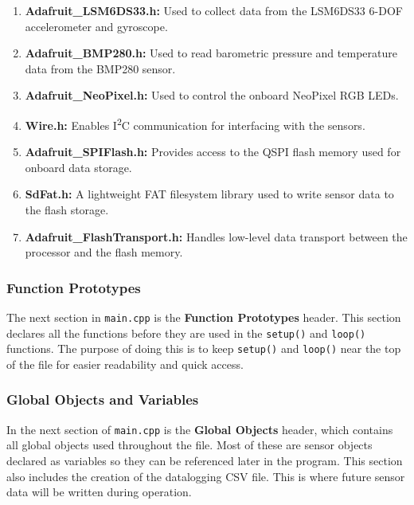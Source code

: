 \documentclass[12pt]{report}
\begin{document}
\begin{enumerate}
    \item \textbf{Adafruit\_LSM6DS33.h:} Used to collect data from the LSM6DS33 6-DOF accelerometer and gyroscope.
    \item \textbf{Adafruit\_BMP280.h:} Used to read barometric pressure and temperature data from the BMP280 sensor.
    \item \textbf{Adafruit\_NeoPixel.h:} Used to control the onboard NeoPixel RGB LEDs.
    \item \textbf{Wire.h:} Enables I\textsuperscript{2}C communication for interfacing with the sensors.
    \item \textbf{Adafruit\_SPIFlash.h:} Provides access to the QSPI flash memory used for onboard data storage.
    \item \textbf{SdFat.h:} A lightweight FAT filesystem library used to write sensor data to the flash storage.
    \item \textbf{Adafruit\_FlashTransport.h:} Handles low-level data transport between the processor and the flash memory.
\end{enumerate}


\subsubsection*{Function Prototypes}

The next section in \texttt{main.cpp} is the \textbf{Function Prototypes} header. This section declares all the functions before they are used in the \texttt{setup()} and \texttt{loop()} functions. The purpose of doing this is to keep \texttt{setup()} and \texttt{loop()} near the top of the file for easier readability and quick access. \\



\subsubsection*{Global Objects and Variables}

In the next section of \texttt{main.cpp} is the \textbf{Global Objects} header, which contains all global objects used throughout the file. Most of these are sensor objects declared as variables so they can be referenced later in the program. This section also includes the creation of the datalogging CSV file. This is where future sensor data will be written during operation. \\
\end{document}
